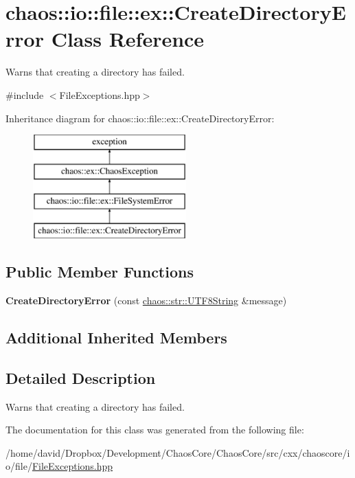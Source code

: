 \hypertarget{classchaos_1_1io_1_1file_1_1ex_1_1_create_directory_error}{\section{chaos\-:\-:io\-:\-:file\-:\-:ex\-:\-:Create\-Directory\-Error Class Reference}
\label{classchaos_1_1io_1_1file_1_1ex_1_1_create_directory_error}
}


Warns that creating a directory has failed.  




{\ttfamily \#include $<$File\-Exceptions.\-hpp$>$}

Inheritance diagram for chaos\-:\-:io\-:\-:file\-:\-:ex\-:\-:Create\-Directory\-Error\-:\begin{figure}[H]
\begin{center}
\leavevmode
\includegraphics[height=4.000000cm]{classchaos_1_1io_1_1file_1_1ex_1_1_create_directory_error}
\end{center}
\end{figure}
\subsection*{Public Member Functions}
\begin{DoxyCompactItemize}
\item 
\hypertarget{classchaos_1_1io_1_1file_1_1ex_1_1_create_directory_error_a216b504fcc4a3552315ae2c207532576}{{\bfseries Create\-Directory\-Error} (const \hyperlink{classchaos_1_1str_1_1_u_t_f8_string}{chaos\-::str\-::\-U\-T\-F8\-String} \&message)}\label{classchaos_1_1io_1_1file_1_1ex_1_1_create_directory_error_a216b504fcc4a3552315ae2c207532576}

\end{DoxyCompactItemize}
\subsection*{Additional Inherited Members}


\subsection{Detailed Description}
Warns that creating a directory has failed. 

The documentation for this class was generated from the following file\-:\begin{DoxyCompactItemize}
\item 
/home/david/\-Dropbox/\-Development/\-Chaos\-Core/\-Chaos\-Core/src/cxx/chaoscore/io/file/\hyperlink{_file_exceptions_8hpp}{File\-Exceptions.\-hpp}\end{DoxyCompactItemize}
